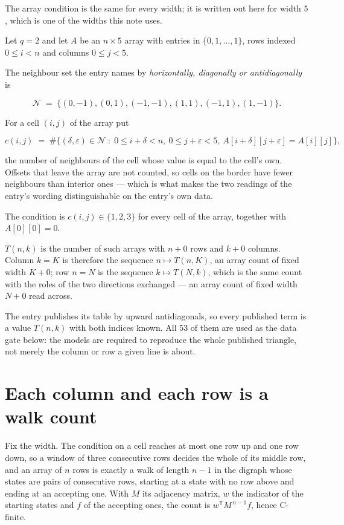 \documentclass[11pt]{article}
\theoremstyle{definition}
\begin{document}
The array condition is the same for every width; it is written out here for width $5$, which is one of the widths this note uses.

Let $q = 2$ and let $A$ be an $n \times 5$ array with entries in $\{0,1,\dots,1\}$, rows indexed $0 \le i < n$ and columns $0 \le j < 5$.

The neighbour set the entry names by {\itshape horizontally, diagonally or antidiagonally} is

\[\mathcal{N} \;=\; \{(0,-1), (0,1), (-1,-1), (1,1), (-1,1), (1,-1)\}.\]

For a cell $(i,j)$ of the array put

\[c(i,j) \;=\; \#\bigl\{(\delta,\varepsilon)\in\mathcal{N} \;:\; 0\le i+\delta<n,\ 0\le j+\varepsilon<5,\ A[i+\delta][j+\varepsilon] = A[i][j]\bigr\},\]

the number of neighbours of the cell whose value is equal to the cell's own. Offsets that leave the array are not counted, so cells on the border have fewer neighbours than interior ones --- which is what makes the two readings of the entry's wording distinguishable on the entry's own data.

The condition is $c(i,j) \in \{1, 2, 3\}$ for every cell of the array, together with $A[0][0]=0$.

$T(n,k)$ is the number of such arrays with $n + 0$ rows and $k + 0$ columns. Column $k = K$ is therefore the sequence $n \mapsto T(n,K)$, an array count of fixed width $K + 0$; row $n = N$ is the sequence $k \mapsto T(N,k)$, which is the same count with the roles of the two directions exchanged --- an array count of fixed width $N + 0$ read across.

The entry publishes its table by upward antidiagonals, so every published term is a value $T(n,k)$ with both indices known. All 53 of them are used as the data gate below: the models are required to reproduce the whole published triangle, not merely the column or row a given line is about.

\section{Each column and each row is a walk count}

Fix the width. The condition on a cell reaches at most one row up and one row down, so a window of three consecutive rows decides the whole of its middle row, and an array of $n$ rows is exactly a walk of length $n-1$ in the digraph whose states are pairs of consecutive rows, starting at a state with no row above and ending at an accepting one. With $M$ its adjacency matrix, $w$ the indicator of the starting states and $f$ of the accepting ones, the count is $w^{\mathsf T}M^{\,n-1}f$, hence C-finite.
\end{document}
